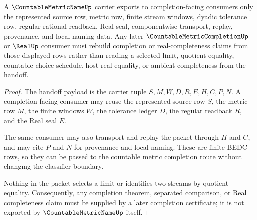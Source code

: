 \begin{theorem}
\label{thm:countable-metric-name-completion-handoff}
A $\CountableMetricNameUp$ carrier exports to completion-facing consumers only the represented source row, metric row, finite stream windows, dyadic tolerance row, regular rational readback, Real seal, componentwise transport, replay, provenance, and local naming data. Any later $\CountableMetricCompletionUp$ or $\RealUp$ consumer must rebuild completion or real-completeness claims from those displayed rows rather than reading a selected limit, quotient equality, countable-choice schedule, host real equality, or ambient completeness from the handoff.
\end{theorem}
\begin{proof}
The handoff payload is the carrier tuple $S,M,W,D,R,E,H,C,P,N$. A completion-facing consumer may reuse the represented source row $S$, the metric row $M$, the finite windows $W$, the tolerance ledger $D$, the regular readback $R$, and the Real seal $E$.

The same consumer may also transport and replay the packet through $H$ and $C$, and may cite $P$ and $N$ for provenance and local naming. These are finite BEDC rows, so they can be passed to the countable metric completion route without changing the classifier boundary.

Nothing in the packet selects a limit or identifies two streams by quotient equality. Consequently, any completion theorem, separated comparison, or Real completeness claim must be supplied by a later completion certificate; it is not exported by $\CountableMetricNameUp$ itself.
\end{proof}


\begin{closurestatus}{\CountableMetricNameUp}
  \theoryclosure{\seedClosure}
  \formalstatus{\unformalizedV}
\end{closurestatus}
